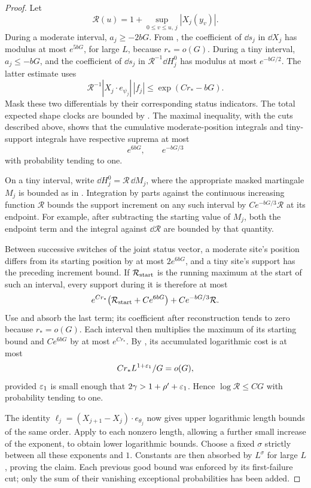 \begin{proof}
Let
\[
 \mathcal R(u)=1+\sup_{0\le v\le u,\,j}|X_j(y_v)|.
\]
During a moderate interval, \(a_j\ge-2bG\).  From
, the coefficient of \(\dd s_j\) in
\(\dd X_j\) has modulus at most \(e^{5bG}\), for large \(L\), because
\(r_*=o(G)\).  During a tiny interval, \(a_j\le-bG\), and the coefficient
of \(\dd s_j\) in \(\mathcal R^{-1}\dd H_j^0\) has modulus at most
\(e^{-bG/2}\).  The latter estimate uses
\[
 \mathcal R^{-1}|X_j\cdot e_{\psi_j}|\,|f_j|
       \le \exp(Cr_*-bG).
\]
Mask these two differentials by their corresponding status indicators.
The total expected shape clocks are bounded by
.  The maximal inequality, with the cuts described
above, shows that the cumulative moderate-position integrals and
tiny-support integrals have respective suprema at most
\begin{equation}
 e^{6bG},\qquad e^{-bG/3}
 \label{odd:masked-integrals}
\end{equation}
with probability tending to one.

On a tiny interval, write \(\dd H_j^0=\mathcal R\,\dd M_j\), where the
appropriate masked martingale \(M_j\) is bounded as in
.  Integration by parts against the continuous
increasing function \(\mathcal R\) bounds the support increment on any
such interval by
\(C e^{-bG/3}\mathcal R\) at its endpoint.  For example, after subtracting
the starting value of \(M_j\), both the endpoint term and the integral
against \(\dd\mathcal R\) are bounded by that quantity.

Between successive switches of the joint status vector, a moderate site's
position differs from its starting position by at most \(2e^{6bG}\), and
a tiny site's support has the preceding increment bound.  If
\(\mathcal R_{\rm start}\) is the running maximum at the start of such
an interval, every support during it is therefore at most
\begin{equation}
 e^{Cr_*}\bigl(\mathcal R_{\rm start}+C e^{6bG}\bigr)
       +C e^{-bG/3}\mathcal R.
 \label{odd:support-interval-bound}
\end{equation}
Use  and absorb the last term; its coefficient
after reconstruction tends to zero because \(r_*=o(G)\).  Each interval
then multiplies the maximum of its starting bound and \(C e^{6bG}\) by
at most \(e^{Cr_*}\).  By , its accumulated
logarithmic cost is at most
\[
 C r_*L^{1+\varepsilon_1}/G=o(G),
\]
provided \(\varepsilon_1\) is small enough that
\(2\gamma>1+\rho'+\varepsilon_1\).  Hence \(\log\mathcal R\le C G\) with
probability tending to one.

The identity \(\ell_j=(X_{j+1}-X_j)\cdot e_{\theta_j}\) now gives upper
logarithmic length bounds of the same order.  Apply
 to each nonzero length, allowing a further small
increase of the exponent, to obtain lower logarithmic bounds.  Choose a
fixed \(\sigma\) strictly between all these exponents and \(1\).
Constants are then absorbed by \(L^\sigma\) for large \(L\), proving the
claim.  Each previous good bound was enforced by its first-failure cut;
only the sum of their vanishing exceptional probabilities has been added.
\end{proof}


